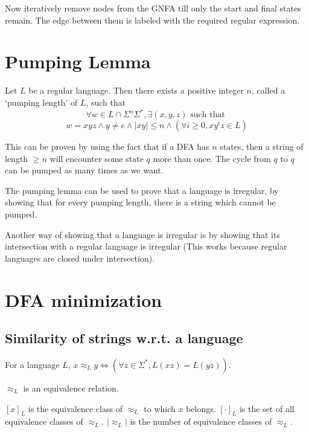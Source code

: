 Now iteratively remove nodes from the GNFA till only the start and final states remain.
The edge between them is labeled with the required regular expression.

\section{Pumping Lemma}

\begin{theorem}
Let $L$ be a regular language.
Then there exists a positive integer $n$, called a `pumping length' of $L$, such that
\[ \forall w \in L \cap \Sigma^n\Sigma^*,
\exists (x, y, z) \textrm{ such that } \]
\[ w = xyz \wedge y \neq e \wedge |xy| \le n \wedge
(\forall i \ge 0, xy^iz \in L) \]
\end{theorem}

This can be proven by using the fact that if a DFA has $n$ states,
then a string of length $\ge n$ will encounter some state $q$ more than once.
The cycle from $q$ to $q$ can be pumped as many times as we want.

The pumping lemma can be used to prove that a language is irregular,
by showing that for every pumping length, there is a string which cannot be pumped.

Another way of showing that a language is irregular is by showing that its
intersection with a regular language is irregular
(This works because regular languages are closed under intersection).

\section{DFA minimization}

\subsection{Similarity of strings w.r.t. a language}

\begin{definition}
For a language $L$, $x \approx_L y \iff (\forall z \in \Sigma^*, L(xz) = L(yz))$.
\end{definition}

\begin{theorem}$\approx_L$ is an equivalence relation.\end{theorem}
\begin{definition}
$[x]_L$ is the equivalence class of $\approx_L$ to which $x$ belongs.
$[\cdot]_L$ is the set of all equivalence classes of $\approx_L$.
$|\approx_L|$ is the number of equivalence classes of $\approx_L$.
\end{definition}

